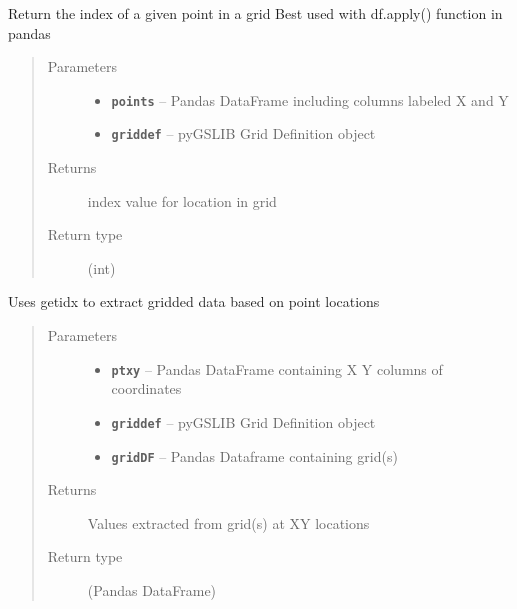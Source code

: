 \documentclass[letterpaper,10pt,english]{sphinxmanual}
\begin{document}

\begin{fulllineitems}
\label{index:pygeos.utils.getidx}
Return the index of a given point in a grid
Best used with df.apply() function in pandas
\begin{quote}\begin{description}
\item[{Parameters}] \leavevmode\begin{itemize}
\item {} 
\textbf{\texttt{points}} -- Pandas DataFrame including columns labeled X and Y

\item {} 
\textbf{\texttt{griddef}} -- pyGSLIB Grid Definition object

\end{itemize}

\item[{Returns}] \leavevmode
index value for location in grid

\item[{Return type}] \leavevmode
(int)

\end{description}\end{quote}

\end{fulllineitems}


\begin{fulllineitems}
\label{index:pygeos.utils.gridExtract}
Uses getidx to extract gridded data based on point locations
\begin{quote}\begin{description}
\item[{Parameters}] \leavevmode\begin{itemize}
\item {} 
\textbf{\texttt{ptxy}} -- Pandas DataFrame containing X Y columns of coordinates

\item {} 
\textbf{\texttt{griddef}} -- pyGSLIB Grid Definition object

\item {} 
\textbf{\texttt{gridDF}} -- Pandas Dataframe containing grid(s)

\end{itemize}

\item[{Returns}] \leavevmode
Values extracted from grid(s) at XY locations

\item[{Return type}] \leavevmode
(Pandas DataFrame)

\end{description}\end{quote}

\end{fulllineitems}
\end{document}
